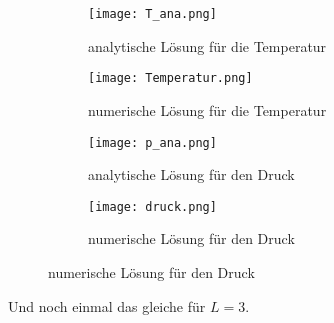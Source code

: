 \documentclass[12pt]{article}
\begin{document}
\begin{figure}[H]\hspace*{-1.5cm}
\begin{subfigure}{0.4\textwidth}
\texttt{[image: T\_ana.png]}
\caption{analytische Lösung für die Temperatur}
\end{subfigure}
\hfill
\begin{subfigure}{0.4\textwidth}
\hspace*{-0.8cm}
\texttt{[image: Temperatur.png]}
\caption{numerische Lösung für die Temperatur}
\end{subfigure}
\hfill
\hspace*{-1.5cm}
\begin{subfigure}{0.4\textwidth}
\texttt{[image: p\_ana.png]}
\caption{analytische Lösung für den Druck}
\end{subfigure}
\hfill
\begin{subfigure}{0.4\textwidth}
\hspace*{-0.8cm}
\texttt{[image: druck.png]}
\caption{numerische Lösung für den Druck}
\end{subfigure}
\hfill
\end{figure}
Und noch einmal das gleiche für $L=3$.
\end{document}
